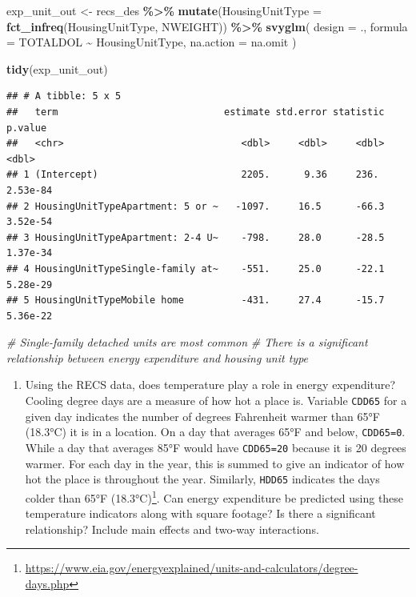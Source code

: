 \documentclass[
]{krantz}
\makeatletter
\newenvironment{Shaded}{\begin{snugshade}}{\end{snugshade}}
\newcommand{\AttributeTok}[1]{\textcolor[rgb]{0.27,0.27,0.27}{#1}}
\newcommand{\CommentTok}[1]{\textcolor[rgb]{0.37,0.37,0.37}{\textit{#1}}}
\newcommand{\FunctionTok}[1]{\textcolor[rgb]{0.27,0.27,0.27}{\textbf{#1}}}
\newcommand{\NormalTok}[1]{#1}
\newcommand{\OtherTok}[1]{\textcolor[rgb]{0.37,0.37,0.37}{#1}}
\newcommand{\SpecialCharTok}[1]{\textcolor[rgb]{0.43,0.43,0.43}{\textbf{#1}}}
\providecommand{\tightlist}{%
  \setlength{\itemsep}{0pt}\setlength{\parskip}{0pt}}
\newenvironment{kframe}{%
\medskip{}
\setlength{\fboxsep}{.8em}
 \def\at@end@of@kframe{}%
 \ifinner\ifhmode%
  \def\at@end@of@kframe{\end{minipage}}%
  \begin{minipage}{\columnwidth}%
 \fi\fi%
 \def\FrameCommand##1{\hskip\@totalleftmargin \hskip-\fboxsep
 \colorbox{shadecolor}{##1}\hskip-\fboxsep
     \hskip-\linewidth \hskip-\@totalleftmargin \hskip\columnwidth}%
 \MakeFramed {\advance\hsize-\width
   \@totalleftmargin\z@ \linewidth\hsize
   \@setminipage}}%
 {\par\unskip\endMakeFramed%
 \at@end@of@kframe}
\renewenvironment{Shaded}{\begin{kframe}}{\end{kframe}}
\makeatother
\begin{document}
\begin{Shaded}
\begin{Highlighting}[]
\NormalTok{exp\_unit\_out }\OtherTok{\textless{}{-}}\NormalTok{ recs\_des }\SpecialCharTok{\%\textgreater{}\%}
  \FunctionTok{mutate}\NormalTok{(}\AttributeTok{HousingUnitType =} \FunctionTok{fct\_infreq}\NormalTok{(HousingUnitType, NWEIGHT)) }\SpecialCharTok{\%\textgreater{}\%}
  \FunctionTok{svyglm}\NormalTok{(}
    \AttributeTok{design =}\NormalTok{ .,}
    \AttributeTok{formula =}\NormalTok{ TOTALDOL }\SpecialCharTok{\textasciitilde{}}\NormalTok{ HousingUnitType,}
    \AttributeTok{na.action =}\NormalTok{ na.omit}
\NormalTok{  )}

\FunctionTok{tidy}\NormalTok{(exp\_unit\_out)}
\end{Highlighting}
\end{Shaded}

\begin{verbatim}
## # A tibble: 5 x 5
##   term                             estimate std.error statistic  p.value
##   <chr>                               <dbl>     <dbl>     <dbl>    <dbl>
## 1 (Intercept)                         2205.      9.36     236.  2.53e-84
## 2 HousingUnitTypeApartment: 5 or ~   -1097.     16.5      -66.3 3.52e-54
## 3 HousingUnitTypeApartment: 2-4 U~    -798.     28.0      -28.5 1.37e-34
## 4 HousingUnitTypeSingle-family at~    -551.     25.0      -22.1 5.28e-29
## 5 HousingUnitTypeMobile home          -431.     27.4      -15.7 5.36e-22
\end{verbatim}

\begin{Shaded}
\begin{Highlighting}[]
\CommentTok{\# Single{-}family detached units are most common}
\CommentTok{\# There is a significant relationship between energy expenditure and housing unit type}
\end{Highlighting}
\end{Shaded}

\begin{enumerate}
\def\labelenumi{\arabic{enumi}.}
\setcounter{enumi}{1}
\tightlist
\item
  Using the RECS data, does temperature play a role in energy expenditure? Cooling degree days are a measure of how hot a place is. Variable \texttt{CDD65} for a given day indicates the number of degrees Fahrenheit warmer than 65°F (18.3°C) it is in a location. On a day that averages 65°F and below, \texttt{CDD65=0}. While a day that averages 85°F would have \texttt{CDD65=20} because it is 20 degrees warmer. For each day in the year, this is summed to give an indicator of how hot the place is throughout the year. Similarly, \texttt{HDD65} indicates the days colder than 65°F (18.3°C)\footnote{\url{https://www.eia.gov/energyexplained/units-and-calculators/degree-days.php}}. Can energy expenditure be predicted using these temperature indicators along with square footage? Is there a significant relationship? Include main effects and two-way interactions.
\end{enumerate}
\end{document}

